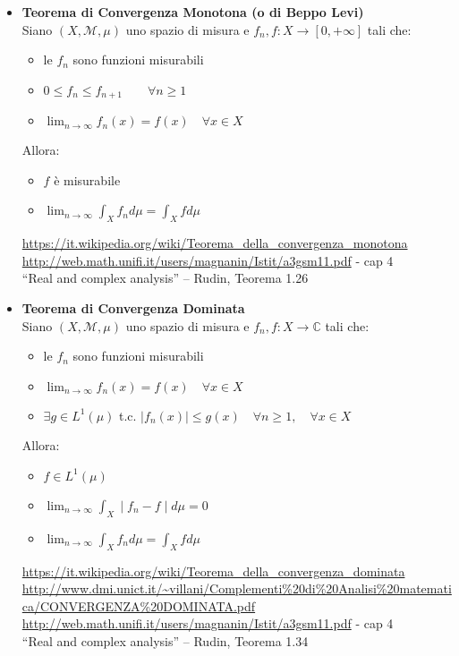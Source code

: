 \documentclass[12pt,a4paper]{report}
\begin{document}
\begin{itemize}

\item \textbf{Teorema di Convergenza Monotona (o di Beppo Levi)} \\
Siano \( \left(X, \mathcal{M}, \mu\right) \) uno spazio di misura e \(f_{n}, f : X \rightarrow \left[0, +\infty \right]\) tali che:
\begin{itemize}
\item le \(f_{n}\) sono funzioni misurabili
\item \(0 \leq f_{n} \leq f_{n+1} \qquad \forall n \geq 1\)
\item \(\displaystyle{\lim_{n \to \infty} f_{n}\left( x \right) = f \left( x \right) \quad \forall x \in X }\)
\end{itemize}
Allora:
\begin{itemize}
\item \(f\) è misurabile
\item \( \displaystyle{\lim _{n \to \infty} \int _{X} f_{n} d\mu = \int_{X}f d\mu}\)
\end{itemize}
\url{https://it.wikipedia.org/wiki/Teorema_della_convergenza_monotona}\\
\url{http://web.math.unifi.it/users/magnanin/Istit/a3gsm11.pdf} - cap 4\\
“Real and complex analysis” – Rudin, Teorema 1.26


\item \textbf{Teorema di Convergenza Dominata}\\
Siano \( \left(X, \mathcal{M}, \mu\right) \) uno spazio di misura e \(f_{n}, f : X \rightarrow \mathbb{C}\) tali che:
\begin{itemize}
\item le \(f_{n}\) sono funzioni misurabili
\item \(\displaystyle{\lim _{{n\to \infty }}f_{n}(x)=f(x)\quad \forall x\in X}\)
\item \(\exists g\in L^{1}(\mu)\) \quad t.c. \( |f_{n}(x)|\leq g(x) \quad \forall n \geq 1, \quad \forall x \in X\)
\end{itemize}
Allora:
\begin{itemize}
\item \(f \in L^1(\mu)\)
\item \(\displaystyle {\lim _{n \to \infty }\int _{X}\mid f_{n}-f\mid d\mu =0} \)
\item \( \displaystyle{\lim _{n \to \infty} \int _{X} f_{n} d\mu = \int_{X}f d\mu}\)
\end{itemize}
\url{ https://it.wikipedia.org/wiki/Teorema_della_convergenza_dominata}\\
\url{http://www.dmi.unict.it/~villani/Complementi%20di%20Analisi%20matematica/CONVERGENZA%20DOMINATA.pdf}\\
\url{http://web.math.unifi.it/users/magnanin/Istit/a3gsm11.pdf} - cap 4\\
“Real and complex analysis” – Rudin, Teorema 1.34


\end{itemize}
\end{document}
